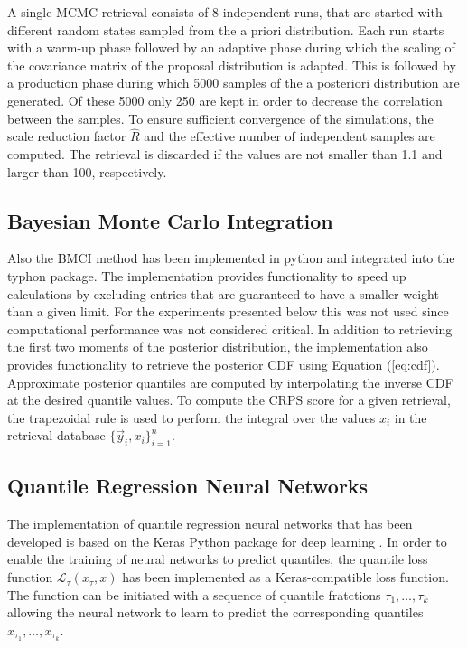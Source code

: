 \documentclass[journal abbreviation, manuscript]{copernicus}
\begin{document}
   A single MCMC retrieval consists of 8 independent runs, that are started with
   different random states sampled from the a priori distribution. Each run
   starts with a warm-up phase followed by an adaptive phase during which the
   scaling of the covariance matrix of the proposal distribution is adapted. This is
   followed by a production phase during which 5000 samples of the a posteriori
   distribution are generated. Of these 5000 only 250 are kept in order to decrease
   the correlation between the samples. To ensure sufficient convergence of the
   simulations, the scale reduction factor $\hat{R}$ and the effective number of
   independent samples \citep[eqs. (11.12), (11.13)]{bda} are computed. The
   retrieval is discarded if the values are not smaller than 1.1 and larger than
   100, respectively.
   
\subsection{Bayesian Monte Carlo Integration}

  Also the BMCI method has been implemented in python and integrated into the
  typhon package. The implementation provides functionality to speed up
  calculations by excluding entries that are guaranteed to have a smaller weight
  than a given limit. For the experiments presented below this was not used
  since computational performance was not considered critical. In addition to
  retrieving the first two moments of the posterior distribution, the
  implementation also provides functionality to retrieve the posterior CDF using
  Equation (\ref{eq:cdf}). Approximate posterior quantiles are computed by
  interpolating the inverse CDF at the desired quantile values. To compute the
  CRPS score for a given retrieval, the trapezoidal rule is used to perform the
  integral over the values $x_i$ in the retrieval database $\{\vec{y}_i,
  x_i\}_{i = 1}^n$.

\subsection{Quantile Regression Neural Networks}

    The implementation of quantile regression neural networks that has been
    developed is based on the Keras Python package for deep learning
    \citep{keras}. In order to enable the training of neural networks to predict
    quantiles, the quantile loss function $\mathcal{L}_\tau(x_\tau, x)$ has been
    implemented as a Keras-compatible loss function. The function can be
    initiated with a sequence of quantile fratctions $\tau_1, \ldots, \tau_k$
    allowing the neural network to learn to predict the corresponding quantiles
    $x_{\tau_1}, \ldots, x_{\tau_k}$.
\end{document}
